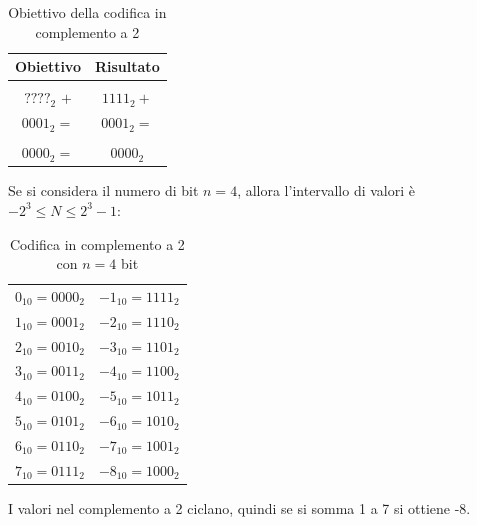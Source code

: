 \documentclass[a4paper]{article}
\theoremstyle{break}
\theoremstyle{break}
\theoremstyle{break}
\theoremstyle{break}
\begin{document}
\begin{table}[H]
    \begin{center}
        \begin{tabular}{ c|c }
            Obiettivo            & Risultato      \\
            \hline                                \\
            \( ????_2 \) \( + \) & \( 1111_2 + \) \\
            \( 0001_2 = \)       & \( 0001_2 = \) \\ [2ex]
            \hline                                \\
            \( 0000_2 = \)       & \( 0000_2 \)   \\
        \end{tabular}
    \end{center}
    \caption{Obiettivo della codifica in complemento a 2}
\end{table}

Se si considera il numero di bit \( n=4 \), allora l'intervallo di valori è
\( -2^3 \le N \le 2^3-1 \):

\begin{table}[H]
    \begin{center}
        \begin{tabular}{c|c}
            \( 0_{10} = 0000_{2}\) & \( -1_{10} = 1111_{2}\) \\
            \( 1_{10} = 0001_{2}\) & \( -2_{10} = 1110_{2}\) \\
            \( 2_{10} = 0010_{2}\) & \( -3_{10} = 1101_{2}\) \\
            \( 3_{10} = 0011_{2}\) & \( -4_{10} = 1100_{2}\) \\
            \( 4_{10} = 0100_{2}\) & \( -5_{10} = 1011_{2}\) \\
            \( 5_{10} = 0101_{2}\) & \( -6_{10} = 1010_{2}\) \\
            \( 6_{10} = 0110_{2}\) & \( -7_{10} = 1001_{2}\) \\
            \( 7_{10} = 0111_{2}\) & \( -8_{10} = 1000_{2}\) \\
        \end{tabular}
    \end{center}
    \caption{Codifica in complemento a 2 con \( n=4 \) bit}
\end{table}
I valori nel complemento a 2 ciclano, quindi se si somma 1 a 7 si ottiene -8.
\end{document}
